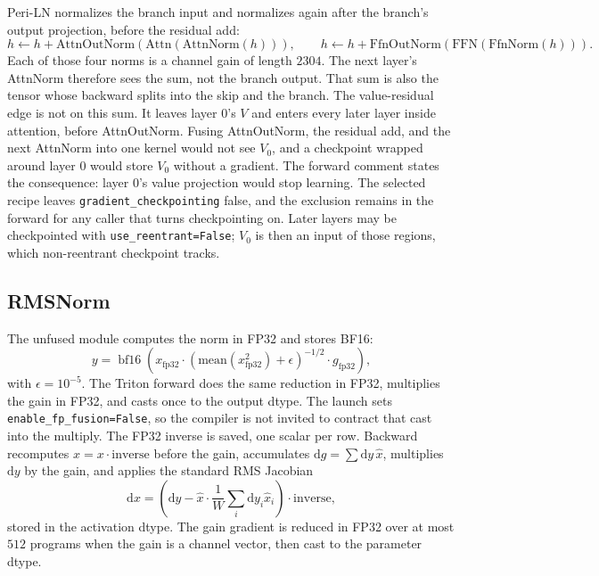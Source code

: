 \documentclass[11pt]{article}
\DeclareRobustCommand{\code}[1]{\texttt{#1}}
\newcommand{\bfsixteen}{\operatorname{bf16}}
\begin{document}
Peri-LN normalizes the branch input and normalizes again after the branch's
output projection, before the residual add:
\begin{equation}
h \leftarrow h + \mathrm{AttnOutNorm}(\mathrm{Attn}(\mathrm{AttnNorm}(h))),
\qquad
h \leftarrow h + \mathrm{FfnOutNorm}(\mathrm{FFN}(\mathrm{FfnNorm}(h))).
\end{equation}
Each of those four norms is a channel gain of length \(2304\). The next
layer's AttnNorm therefore sees the sum, not the branch output. That sum is
also the tensor whose backward splits into the skip and the branch. The
value-residual edge is not on this sum. It leaves layer \(0\)'s \(V\) and
enters every later layer inside attention, before AttnOutNorm. Fusing
AttnOutNorm, the residual add, and the next AttnNorm into one kernel would
not see \(V_0\), and a checkpoint wrapped around layer \(0\) would store
\(V_0\) without a gradient. The forward comment states the consequence:
layer \(0\)'s value projection would stop learning. The selected recipe
leaves \code{gradient\_checkpointing} false, and the exclusion remains in the
forward for any caller that turns checkpointing on. Later layers may be
checkpointed with \code{use\_reentrant=False}; \(V_0\) is then an input of
those regions, which non-reentrant checkpoint tracks.

\subsection{RMSNorm}

The unfused module computes the norm in FP32 and stores BF16:
\begin{equation}
y = \bfsixteen\!\left(
  x_{\mathrm{fp32}}\cdot
  \left(\mathrm{mean}(x_{\mathrm{fp32}}^{2})+\epsilon\right)^{-1/2}
  \cdot g_{\mathrm{fp32}}
\right),
\end{equation}
with \(\epsilon=10^{-5}\). The Triton forward does the same reduction in
FP32, multiplies the gain in FP32, and casts once to the output dtype. The
launch sets \code{enable\_fp\_fusion=False}, so the compiler is not invited
to contract that cast into the multiply. The FP32 inverse is saved, one
scalar per row. Backward recomputes
\(\hat{x}=x\cdot\mathrm{inverse}\) before the gain, accumulates
\(\mathrm{d}g=\sum \mathrm{d}y\,\hat{x}\), multiplies \(\mathrm{d}y\) by the
gain, and applies the standard RMS Jacobian
\begin{equation}
\mathrm{d}x
 =
 \left(\mathrm{d}y - \hat{x}\cdot\frac{1}{W}\sum_i \mathrm{d}y_i\hat{x}_i\right)
 \cdot\mathrm{inverse},
\end{equation}
stored in the activation dtype. The gain gradient is reduced in FP32 over at
most \(512\) programs when the gain is a channel vector, then cast to the
parameter dtype.
\end{document}

